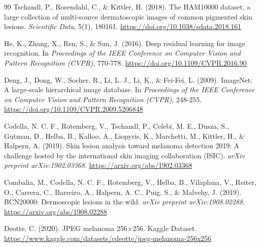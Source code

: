 \documentclass[12pt,a4paper]{article}
\begin{document}
\begin{thebibliography}{99}
Tschandl, P., Rosendahl, C., \& Kittler, H. (2018). The HAM10000 dataset, a large collection of multi-source dermatoscopic images of common pigmented skin lesions. \textit{Scientific Data}, 5(1), 180161. \url{https://doi.org/10.1038/sdata.2018.161}

He, K., Zhang, X., Ren, S., \& Sun, J. (2016). Deep residual learning for image recognition. In \textit{Proceedings of the IEEE Conference on Computer Vision and Pattern Recognition (CVPR)}, 770-778. \url{https://doi.org/10.1109/CVPR.2016.90}

Deng, J., Dong, W., Socher, R., Li, L. J., Li, K., \& Fei-Fei, L. (2009). ImageNet: A large-scale hierarchical image database. In \textit{Proceedings of the IEEE Conference on Computer Vision and Pattern Recognition (CVPR)}, 248-255. \url{https://doi.org/10.1109/CVPR.2009.5206848}

Codella, N. C. F., Rotemberg, V., Tschandl, P., Celebi, M. E., Dusza, S., Gutman, D., Helba, B., Kalloo, A., Liopyris, K., Marchetti, M., Kittler, H., \& Halpern, A. (2019). Skin lesion analysis toward melanoma detection 2019: A challenge hosted by the international skin imaging collaboration (ISIC). \textit{arXiv preprint arXiv:1902.03368}. \url{https://arxiv.org/abs/1902.03368}

Combalia, M., Codella, N. C. F., Rotemberg, V., Helba, B., Vilaplana, V., Reiter, O., Carrera, C., Barreiro, A., Halpern, A. C., Puig, S., \& Malvehy, J. (2019). BCN20000: Dermoscopic lesions in the wild. \textit{arXiv preprint arXiv:1908.02288}. \url{https://arxiv.org/abs/1908.02288}

Deotte, C. (2020). JPEG melanoma 256$\times$256. Kaggle Dataset. \url{https://www.kaggle.com/datasets/cdeotte/jpeg-melanoma-256x256}

\end{thebibliography}
\end{document}
